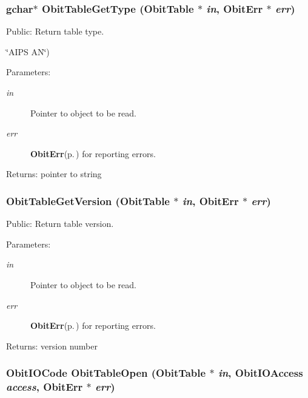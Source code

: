 \subsubsection{\setlength{\rightskip}{0pt plus 5cm}gchar$\ast$ Obit\-Table\-Get\-Type ({\bf Obit\-Table} $\ast$ {\em in}, {\bf Obit\-Err} $\ast$ {\em err})}\label{ObitTable_8h_a47}


Public: Return table type. 

\char`\"{}AIPS AN\char`\"{}) \begin{Desc}
\item[Parameters:]
\begin{description}
\item[{\em in}]Pointer to object to be read. \item[{\em err}]{\bf Obit\-Err}{\rm (p.\,\pageref{structObitErr})} for reporting errors. \end{description}
\end{Desc}
\begin{Desc}
\item[Returns:]pointer to string \end{Desc}
\subsubsection{ Obit\-Table\-Get\-Version ({\bf Obit\-Table} $\ast$ {\em in}, {\bf Obit\-Err} $\ast$ {\em err})}\label{ObitTable_8h_a48}


Public: Return table version. 

\begin{Desc}
\item[Parameters:]
\begin{description}
\item[{\em in}]Pointer to object to be read. \item[{\em err}]{\bf Obit\-Err}{\rm (p.\,\pageref{structObitErr})} for reporting errors. \end{description}
\end{Desc}
\begin{Desc}
\item[Returns:]version number \end{Desc}
\subsubsection{\setlength{\rightskip}{0pt plus 5cm}Obit\-IOCode Obit\-Table\-Open ({\bf Obit\-Table} $\ast$ {\em in}, Obit\-IOAccess {\em access}, {\bf Obit\-Err} $\ast$ {\em err})}\label{ObitTable_8h_a39}


